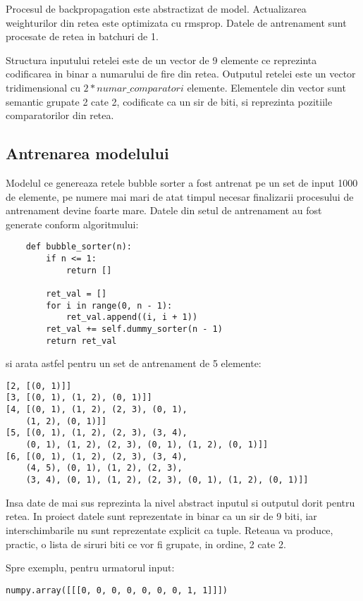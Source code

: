 \documentclass[12pt]{article}
\begin{document}
Procesul de backpropagation este abstractizat de model. Actualizarea weighturilor din retea este optimizata cu rmsprop.
Datele de antrenament sunt procesate de retea in batchuri de 1.

Structura inputului retelei este de un vector de 9 elemente ce reprezinta codificarea in binar a numarului de fire din retea. Outputul retelei este un vector tridimensional cu $2*numar\_comparatori$ elemente. Elementele din vector sunt semantic grupate 2 cate 2, codificate ca un sir de biti, si reprezinta pozitiile comparatorilor din retea. 

\subsection{Antrenarea modelului}

Modelul ce genereaza retele bubble sorter a fost antrenat pe un set de input 1000 de elemente, pe numere mai mari de atat timpul necesar finalizarii procesului de antrenament devine foarte mare. Datele din setul de antrenament au fost generate conform algoritmului:
\begin{lstlisting}
    def bubble_sorter(n):
        if n <= 1:
            return []

        ret_val = []
        for i in range(0, n - 1):
            ret_val.append((i, i + 1))
        ret_val += self.dummy_sorter(n - 1)
        return ret_val
\end{lstlisting}

si arata astfel pentru un set de antrenament de 5 elemente:

\begin{lstlisting}
[2, [(0, 1)]]
[3, [(0, 1), (1, 2), (0, 1)]]
[4, [(0, 1), (1, 2), (2, 3), (0, 1), 
	(1, 2), (0, 1)]]
[5, [(0, 1), (1, 2), (2, 3), (3, 4), 
	(0, 1), (1, 2), (2, 3), (0, 1), (1, 2), (0, 1)]]
[6, [(0, 1), (1, 2), (2, 3), (3, 4), 
	(4, 5), (0, 1), (1, 2), (2, 3), 
	(3, 4), (0, 1), (1, 2), (2, 3), (0, 1), (1, 2), (0, 1)]]
\end{lstlisting}

Insa date de mai sus reprezinta la nivel abstract inputul si outputul dorit pentru retea. In proiect datele sunt reprezentate in binar ca un sir de 9 biti, iar interschimbarile nu sunt reprezentate explicit ca tuple. Reteaua va produce, practic, o lista de siruri biti ce vor fi grupate, in ordine, 2 cate 2.

Spre exemplu, pentru urmatorul input:

\begin{lstlisting}
numpy.array([[[0, 0, 0, 0, 0, 0, 0, 1, 1]]])
\end{lstlisting}
\end{document}

